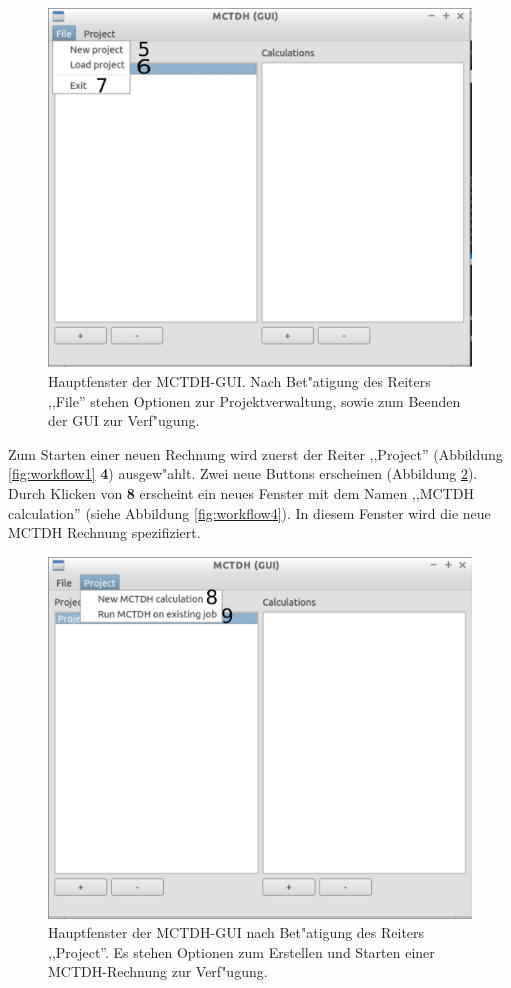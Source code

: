 \begin{figure}
    \centering
    \includegraphics[scale=0.5]{figures/screenMainFile}
    \caption{Hauptfenster der MCTDH-GUI. Nach Bet"atigung des Reiters ,,File''
		stehen Optionen zur Projektverwaltung, sowie zum Beenden der GUI zur Verf"ugung.}\label{fig:workflow2}
\end{figure}

Zum Starten einer neuen Rechnung wird zuerst der Reiter ,,Project'' (Abbildung \ref{fig:workflow1} \textbf{4}) 
ausgew"ahlt. Zwei neue Buttons erscheinen (Abbildung \ref{fig:workflow3}). Durch Klicken von \textbf{8} 
erscheint ein neues Fenster mit dem Namen ,,MCTDH calculation'' (siehe Abbildung \ref{fig:workflow4}). 
In diesem Fenster wird die neue MCTDH Rechnung spezifiziert.

\begin{figure}
    \centering
    \includegraphics[scale=0.5]{figures/screenMainProject}
    \caption{Hauptfenster der MCTDH-GUI nach Bet"atigung des Reiters ,,Project''. Es stehen Optionen zum Erstellen und Starten einer
    MCTDH-Rechnung zur Verf"ugung.}\label{fig:workflow3}
\end{figure}

